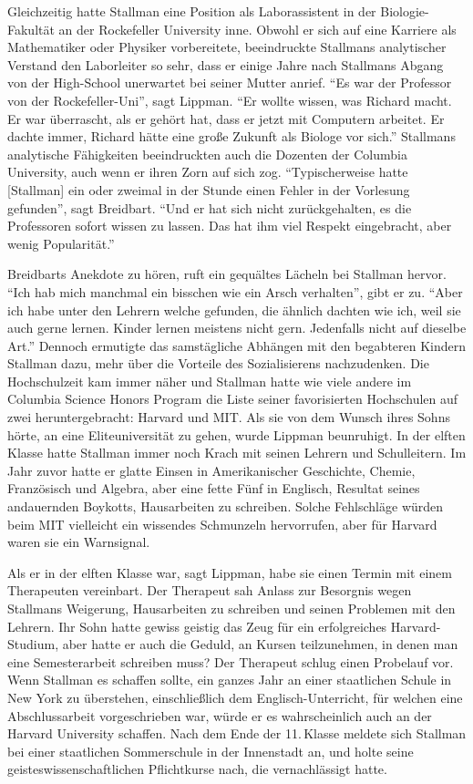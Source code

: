 Gleichzeitig hatte Stallman eine Position als Laborassistent in der Biologie-Fakultät an der Rockefeller University inne. Obwohl er sich auf eine Karriere als Mathematiker oder Physiker vorbereitete, beeindruckte Stallmans analytischer Verstand den Laborleiter so sehr, dass er einige Jahre nach Stallmans Abgang von der High-School unerwartet bei seiner Mutter anrief. "`Es war der Professor von der Rockefeller-Uni"', sagt Lippman. "`Er wollte wissen, was Richard macht. Er war überrascht, als er gehört hat, dass er jetzt mit Computern arbeitet. Er dachte immer, Richard hätte eine große Zukunft als Biologe vor sich."'
Stallmans analytische Fähigkeiten beeindruckten auch die Dozenten der Columbia University, auch wenn er ihren Zorn auf sich zog. "`Typischerweise hatte [Stallman] ein oder zweimal in der Stunde einen Fehler in der Vorlesung gefunden"', sagt Breidbart. "`Und er hat sich nicht zurückgehalten, es die Professoren sofort wissen zu lassen. Das hat ihm viel Respekt eingebracht, aber wenig Popularität."'

Breidbarts Anekdote zu hören, ruft ein gequältes Lächeln bei Stallman hervor. "`Ich hab mich manchmal ein bisschen wie ein Arsch verhalten"', gibt er zu. "`Aber ich habe unter den Lehrern welche gefunden, die ähnlich dachten wie ich, weil sie auch gerne lernen. Kinder lernen meistens nicht gern. Jedenfalls nicht auf dieselbe Art."'
Dennoch ermutigte das samstägliche Abhängen mit den begabteren Kindern Stallman dazu, mehr über die Vorteile des Sozialisierens nachzudenken. Die Hochschulzeit kam immer näher und Stallman hatte wie viele andere im Columbia Science Honors Program die Liste seiner favorisierten Hochschulen auf zwei heruntergebracht: Harvard und MIT. Als sie von dem Wunsch ihres Sohns hörte, an eine Eliteuniversität zu gehen, wurde Lippman beunruhigt.
In der elften Klasse hatte Stallman immer noch Krach mit seinen Lehrern und Schulleitern. Im Jahr zuvor hatte er glatte Einsen in Amerikanischer Geschichte, Chemie, Französisch und Algebra, aber eine fette Fünf in Englisch, Resultat seines andauernden Boykotts, Hausarbeiten zu schreiben. Solche Fehlschläge würden beim MIT vielleicht ein wissendes Schmunzeln hervorrufen, aber für Harvard waren sie ein Warnsignal.

Als er in der elften Klasse war, sagt Lippman, habe sie einen Termin mit einem Therapeuten vereinbart. Der Therapeut sah Anlass zur Besorgnis wegen Stallmans Weigerung, Hausarbeiten zu schreiben und seinen Problemen mit den Lehrern. Ihr Sohn hatte gewiss geistig das Zeug für ein erfolgreiches Harvard-Studium, aber hatte er auch die Geduld, an Kursen teilzunehmen, in denen man eine Semesterarbeit schreiben muss? Der Therapeut schlug einen Probelauf vor. Wenn Stallman es schaffen sollte, ein ganzes Jahr an einer staatlichen Schule in New York zu überstehen, einschließlich dem Englisch-Unterricht, für welchen eine Abschlussarbeit vorgeschrieben war, würde er es wahrscheinlich auch an der Harvard University schaffen. Nach dem Ende der 11.\,Klasse meldete sich Stallman bei einer staatlichen Sommerschule in der Innenstadt an, und holte seine geisteswissenschaftlichen Pflichtkurse nach, die vernachlässigt hatte.

